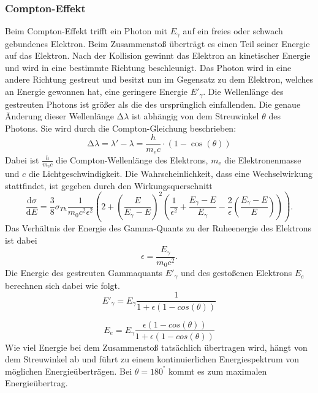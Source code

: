 \subsubsection{Compton-Effekt}
Beim Compton-Effekt trifft ein Photon mit $E_{\gamma}$ auf ein freies oder schwach gebundenes Elektron. Beim Zusammenstoß überträgt es einen Teil seiner Energie auf das 
Elektron. Nach der Kollision gewinnt das Elektron an kinetischer Energie und wird in eine bestimmte Richtung beschleunigt. Das Photon wird in eine andere Richtung gestreut 
und besitzt nun im Gegensatz zu dem Elektron, welches an Energie gewonnen hat, eine geringere Energie $E'_{\gamma}$. Die Wellenlänge des 
gestreuten Photons ist größer als die des ursprünglich einfallenden. Die genaue Änderung dieser Wellenlänge $\increment\lambda$ ist abhängig von dem Streuwinkel $\theta$ des
Photons. Sie wird durch die Compton-Gleichung beschrieben:
\begin{equation}
    \increment\lambda= \lambda'-\lambda=\frac{h}{m_ec}\cdot(1-\cos(\theta)) 
\end{equation}
Dabei ist $\frac{h}{m_\text{e}c}$ die Compton-Wellenlänge des Elektrons, \(m_\text{e}\) die Elektronenmasse und \(c\) die Lichtgeschwindigkeit.
Die Wahrscheinlichkeit, dass eine Wechselwirkung stattfindet, ist gegeben durch den Wirkungsquerschnitt
\begin{equation}
    \frac{\text{d}\sigma}{\text{d}E} = \frac{3}{8}\sigma_{Th}\frac{1}{m_0c^2\epsilon^2}\left(2 + \left(\frac{E}{E_{\gamma}-E}\right)^2 \left(\frac{1}{\epsilon^2} + \frac{E_{\gamma}-E}{E_{\gamma}} - \frac{2}{\epsilon}\left(\frac{E_{\gamma}-E}{E}\right)\right)\right).
    \label{eq:querschnitt}
\end{equation}
Das Verhältnis der Energie des Gamma-Quants zu der Ruheenergie des Elektrons ist dabei
\begin{equation}
    \epsilon=\frac{E_{\gamma}}{m_0c^2}.
\end{equation}    
Die Energie des gestreuten Gammaquants $E'_{\gamma}$ und des gestoßenen Elektrons $E_e$ berechnen sich dabei wie folgt.
\begin{equation}
    E'_{\gamma}=E_{\gamma}\frac{1}{1+\epsilon(1-cos(\theta))}
    \label{eq:estrich}
\end{equation}

\begin{equation}
    E_e=E_{\gamma}\frac{\epsilon(1-cos(\theta))}{1+\epsilon(1-cos(\theta))}
    \label{eq:energie_e}
\end{equation}
Wie viel Energie bei dem Zusammenstoß tatsächlich übertragen wird, hängt von dem Streuwinkel ab und führt zu einem kontinuierlichen
Energiespektrum von möglichen Energieüberträgen. Bei $\theta= 180^°$ kommt es zum maximalen Energieübertrag.
\cite{Compton}


